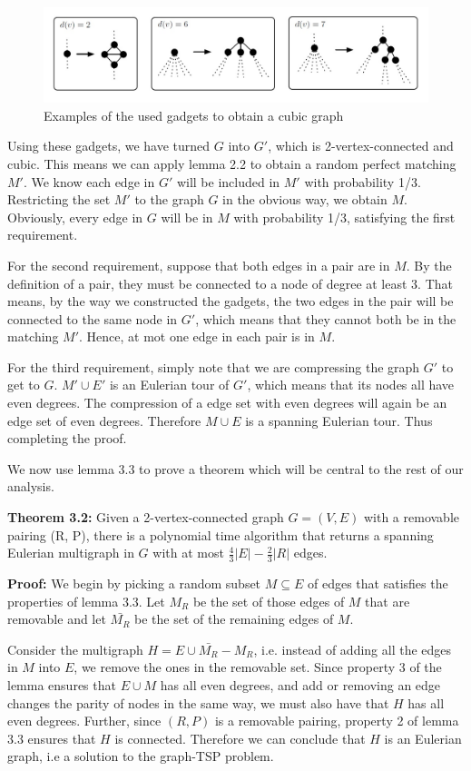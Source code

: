 \documentclass[12pt]{article}
\begin{document}
\begin{figure}[t]
\includegraphics[width=14cm]{gadget.jpg}
\caption{Examples of the used gadgets to obtain a cubic graph}
\end{figure}

Using these gadgets, we have turned $G$ into $G'$, which is 2-vertex-connected and cubic. This means we can apply lemma 2.2 to obtain a random perfect matching $M'$. We know each edge in $G'$ will be included in $M'$ with probability 1/3. Restricting the set $M'$ to the graph $G$ in the obvious way, we obtain $M$. Obviously, every edge in $G$ will be in $M$ with probability 1/3, satisfying the first requirement.

For the second requirement, suppose that both edges in a pair are in $M$. By the definition of a pair, they must be connected to a node of degree at least 3. That means, by the way we constructed the gadgets, the two edges in the pair will be connected to the same node in $G'$, which means that they cannot both be in the matching $M'$. Hence, at mot one edge in each pair is in $M$.

For the third requirement, simply note that we are compressing the graph $G'$ to get to $G$. $M'\cup E'$ is an Eulerian tour of $G'$, which means that its nodes all have even degrees. The compression of a edge set with even degrees will again be an edge set of even degrees. Therefore $M\cup E$ is a spanning Eulerian tour. Thus completing the proof.

We now use lemma 3.3 to prove a theorem which will be central to the rest of our analysis.

{\bf Theorem 3.2:} Given a 2-vertex-connected graph $G = (V,E)$ with a removable pairing (R, P), there is a polynomial time algorithm that returns a spanning Eulerian multigraph in $G$ with at most $\frac{4}{3}|E| - \frac{2}{3}|R|$ edges.

{\bf Proof:}
We begin by picking a random subset $M \subseteq E$ of edges that satisfies the properties of lemma 3.3. Let $M_R$ be the set of those edges of $M$ that are removable and let $\bar{M_R}$ be the set of the remaining edges of $M$.

Consider the multigraph $H = E\cup \bar{M_R} - M_R$, i.e. instead of adding all the edges in $M$ into $E$, we remove the ones in the removable set. Since property 3 of the lemma ensures that $E\cup M$ has all even degrees, and add or removing an edge changes the parity of nodes in the same way, we must also have that $H$ has all even degrees. Further, since $(R,P)$ is a removable pairing, property 2 of lemma 3.3 ensures that $H$ is connected. Therefore we can conclude that $H$ is an Eulerian graph, i.e a solution to the graph-TSP problem.
\end{document}
